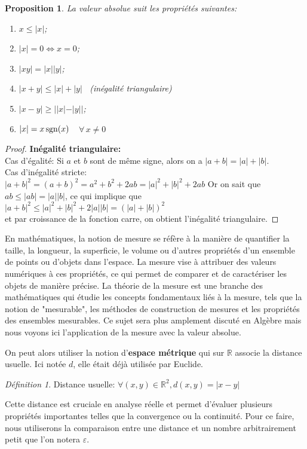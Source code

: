 \documentclass[oneside,12pt,french,table]{book}
\theoremstyle{definition}
\theoremstyle{plain}
\newtheorem{proposition}[definition]{Proposition}
\theoremstyle{remark}
\newtheorem{defi}[definition]{Définition}
\newcommand{\Rr}{{\mathbb{R}}}
\begin{document}
\begin{proposition}\label{prop3}
La valeur absolue suit les propriétés suivantes: 
    \begin{enumerate}
  \item $x\leq |x|$;
  \item $|x|=0 \iff x=0$;
  \item $|xy|=|x||y|$;
  \item $|x+y|\leq |x|+|y|$ \, (inégalité triangulaire)
  \item $|x-y|\geq ||x|-|y||$;
  \item $|x|=x{\, \rm sgn}(x)$ \,\, $\forall \, x \neq0$
\end{enumerate}
\end{proposition}
\begin{proof}
    \textbf{ Inégalité triangulaire: }
\\Cas d'égalité:
Si $a$ et $b$ sont de même signe, alors on a $|a+b|=|a|+|b|$.
\\Cas d'inégalité stricte: 
\\$|a+b|^2 = (a+b)^2 = a^2+b^2+2ab = |a|^2+|b|^2+2ab $
Or on sait que $ab\leq|ab|=|a||b|$, ce qui implique que
\\$|a+b|^2\leq|a|^2+|b|^2+2|a||b|=(|a|+|b|)^2$
\\et par croissance de la fonction carre, on obtient l'inégalité triangulaire. 
\end{proof}



    En mathématiques, la notion de mesure se réfère à la manière de quantifier la taille, la longueur, la superficie, le volume ou d'autres propriétés d'un ensemble de points ou d'objets dans l'espace. La mesure vise à attribuer des valeurs numériques à ces propriétés, ce qui permet de comparer et de caractériser les objets de manière précise. La théorie de la mesure est une branche des mathématiques qui étudie les concepts fondamentaux liés à la mesure, tels que la notion de "mesurable", les méthodes de construction de mesures et les propriétés des ensembles mesurables. Ce sujet sera plus amplement discuté en Algèbre mais nous voyons ici l'application de la mesure avec la valeur absolue.

    On peut alors utiliser la notion d'\textbf{espace métrique} qui sur $\Rr$ associe la distance usuelle. Ici notée $d$, elle était déjà utilisée par Euclide.
    \begin{defi} Distance usuelle:
        $\forall (x,y)\in\Rr ^2, d(x,y)=|x-y|$
    \end{defi}
    Cette distance est cruciale en analyse réelle et permet d'évaluer plusieurs propriétés importantes telles que la convergence ou la continuité. Pour ce faire, nous utiliserons la comparaison entre une distance et un nombre arbitrairement petit que l'on notera $\varepsilon$.
\end{document}
